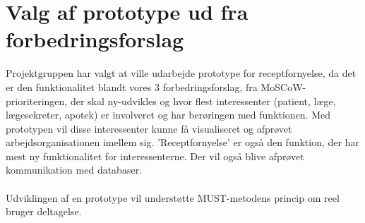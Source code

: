 \newpage
\section{Valg af prototype ud fra forbedringsforslag}
Projektgruppen har valgt at ville udarbejde prototype for receptfornyelse, da det er den funktionalitet blandt vores 3 forbedringsforslag, fra MoSCoW-prioriteringen, der skal ny-udvikles og hvor flest interessenter (patient, læge, lægesekreter, apotek) er involveret og har berøringen med funktionen. Med prototypen vil disse interessenter kunne få visualiseret og afprøvet arbejdsorganisationen imellem sig. ’Receptfornyelse’ er også den funktion, der har mest ny funktionalitet for interessenterne. 
Der vil også blive afprøvet kommunikation med databaser. \\ 
\\
Udviklingen af en prototype vil understøtte MUST-metodens princip om reel bruger deltagelse.
